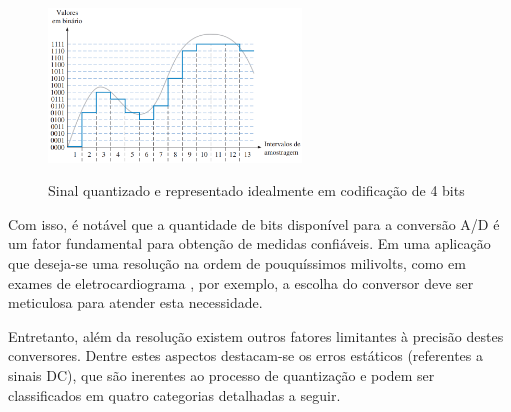 \documentclass[oneside,openright,12pt]{ufsm_2015} %
\begin{document}
\begin{figure}[ht]
    \caption{\label{exepretex} Sinal quantizado e representado idealmente em codificação de 4 bits}
    \centering
    \includegraphics[width=0.6\textwidth]{figuras/quantizado-e-codificado.png}
    \vspace{\baselineskip} %
        \label{fig:quantizado-e-codificado}
\end{figure}

Com isso, é notável que a quantidade de bits disponível para a conversão A/D é um fator fundamental para obtenção de medidas confiáveis. Em uma aplicação que deseja-se uma resolução na ordem de pouquíssimos milivolts, como em exames de eletrocardiograma \cite{lopes2014processo}, por exemplo, a escolha do conversor deve ser meticulosa para atender esta necessidade.

Entretanto, além da resolução existem outros fatores limitantes à precisão destes conversores. Dentre estes aspectos destacam-se os erros estáticos (referentes a sinais DC), que são inerentes ao processo de quantização e podem ser classificados em quatro categorias detalhadas a seguir.
\end{document}
